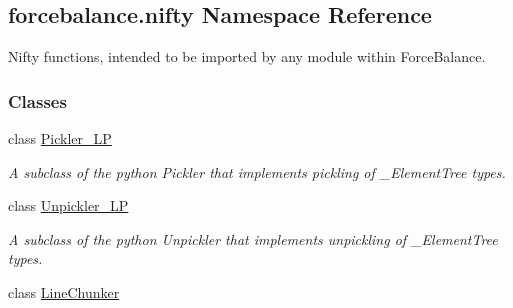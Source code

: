 \hypertarget{namespaceforcebalance_1_1nifty}{\subsection{forcebalance.\-nifty Namespace Reference}
\label{namespaceforcebalance_1_1nifty}
}


Nifty functions, intended to be imported by any module within Force\-Balance.  


\subsubsection*{Classes}
\begin{DoxyCompactItemize}
\item 
class \hyperlink{classforcebalance_1_1nifty_1_1Pickler__LP}{Pickler\-\_\-\-L\-P}
\begin{DoxyCompactList}\small\item\em A subclass of the python Pickler that implements pickling of \-\_\-\-Element\-Tree types. \end{DoxyCompactList}\item 
class \hyperlink{classforcebalance_1_1nifty_1_1Unpickler__LP}{Unpickler\-\_\-\-L\-P}
\begin{DoxyCompactList}\small\item\em A subclass of the python Unpickler that implements unpickling of \-\_\-\-Element\-Tree types. \end{DoxyCompactList}\item 
class \hyperlink{classforcebalance_1_1nifty_1_1LineChunker}{Line\-Chunker}
\end{DoxyCompactItemize}
